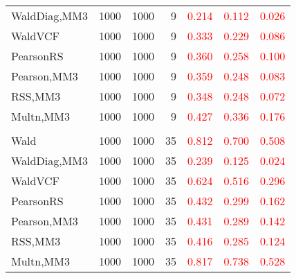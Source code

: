 \documentclass[
]{article}
\begin{document}
\begin{table}[H]
{\begin{tabular}[t]{lrrrrrr}
\hspace{1em}WaldDiag,MM3 & 1000 & 1000 & 9 & \textcolor{red}{0.214} & \textcolor{red}{0.112} & \textcolor{red}{0.026}\\
\hspace{1em}WaldVCF & 1000 & 1000 & 9 & \textcolor{red}{0.333} & \textcolor{red}{0.229} & \textcolor{red}{0.086}\\
\hspace{1em}PearsonRS & 1000 & 1000 & 9 & \textcolor{red}{0.360} & \textcolor{red}{0.258} & \textcolor{red}{0.100}\\
\hspace{1em}Pearson,MM3 & 1000 & 1000 & 9 & \textcolor{red}{0.359} & \textcolor{red}{0.248} & \textcolor{red}{0.083}\\
\hspace{1em}RSS,MM3 & 1000 & 1000 & 9 & \textcolor{red}{0.348} & \textcolor{red}{0.248} & \textcolor{red}{0.072}\\
\hspace{1em}Multn,MM3 & 1000 & 1000 & 9 & \textcolor{red}{0.427} & \textcolor{red}{0.336} & \textcolor{red}{0.176}\\
\addlinespace[0.3em]
\multicolumn{7}{l}{\textbf{3F 15V}}\\
\hspace{1em}Wald & 1000 & 1000 & 35 & \textcolor{red}{0.812} & \textcolor{red}{0.700} & \textcolor{red}{0.508}\\
\hspace{1em}WaldDiag,MM3 & 1000 & 1000 & 35 & \textcolor{red}{0.239} & \textcolor{red}{0.125} & \textcolor{red}{0.024}\\
\hspace{1em}WaldVCF & 1000 & 1000 & 35 & \textcolor{red}{0.624} & \textcolor{red}{0.516} & \textcolor{red}{0.296}\\
\hspace{1em}PearsonRS & 1000 & 1000 & 35 & \textcolor{red}{0.432} & \textcolor{red}{0.299} & \textcolor{red}{0.162}\\
\hspace{1em}Pearson,MM3 & 1000 & 1000 & 35 & \textcolor{red}{0.431} & \textcolor{red}{0.289} & \textcolor{red}{0.142}\\
\hspace{1em}RSS,MM3 & 1000 & 1000 & 35 & \textcolor{red}{0.416} & \textcolor{red}{0.285} & \textcolor{red}{0.124}\\
\hspace{1em}Multn,MM3 & 1000 & 1000 & 35 & \textcolor{red}{0.817} & \textcolor{red}{0.738} & \textcolor{red}{0.528}\\
\bottomrule
\end{tabular}}
\endgroup{}
\end{table}
\end{document}
